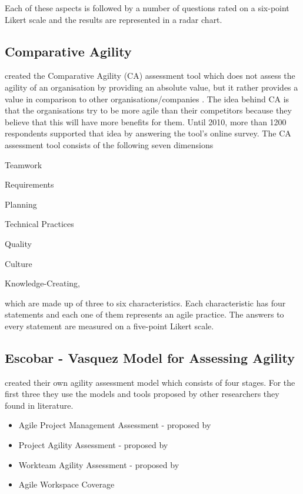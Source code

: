 Each of these aspects is followed by a number of questions rated on a six-point Likert scale and the results are represented in a radar chart.

\subsection{Comparative Agility} %
\citet{comparative_agility} created the Comparative Agility (CA) assessment tool which does not assess the agility of an organisation by providing an absolute value, but it rather provides a value in comparison to other organisations/companies \cite{comparative_agility_web}. The idea behind CA is that the organisations try to be more agile than their competitors because they believe that this will have more benefits for them. Until 2010, more than 1200 respondents supported that idea by answering the tool's online survey. The CA assessment tool consists of the following seven dimensions
\begin{inparaenum} [a\upshape)]
	\item Teamwork
	\item Requirements
	\item Planning
	\item Technical Practices
	\item Quality
	\item Culture
	\item Knowledge-Creating,
\end{inparaenum}
which are made up of three to six characteristics. Each characteristic has four statements and each one of them represents an agile practice. The answers to every statement are measured on a five-point Likert scale.

\subsection{Escobar - Vasquez Model for Assessing Agility} %

\citet{6427226} created their own agility assessment model which consists of four stages. For the first three they use the models and tools proposed by other researchers they found in literature.
\begin{itemize}
\item Agile Project Management Assessment - proposed by \citet{qumer2006measuring}
\item Project Agility Assessment - proposed by \citet{taylor}
\item Workteam Agility Assessment - proposed by \citet{Leffingwell}
\item Agile Workspace Coverage
\end{itemize}

